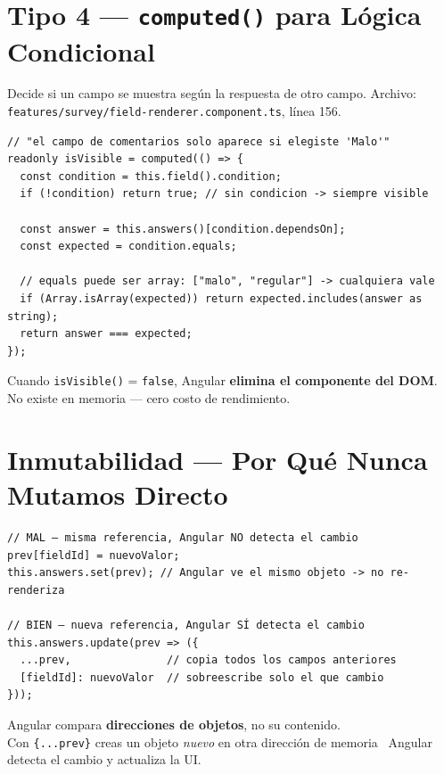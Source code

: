 \documentclass[12pt, a4paper]{article}
\begin{document}
\section{  Tipo 4 — \texttt{computed()} para Lógica Condicional}

Decide si un campo se muestra según la respuesta de otro campo.
Archivo: \textcolor{morado}{\texttt{features/survey/field-renderer.component.ts}}, línea 156.

\begin{lstlisting}
// "el campo de comentarios solo aparece si elegiste 'Malo'"
readonly isVisible = computed(() => {
  const condition = this.field().condition;
  if (!condition) return true; // sin condicion -> siempre visible

  const answer = this.answers()[condition.dependsOn];
  const expected = condition.equals;

  // equals puede ser array: ["malo", "regular"] -> cualquiera vale
  if (Array.isArray(expected)) return expected.includes(answer as string);
  return answer === expected;
});
\end{lstlisting}

\begin{tcolorbox}[importante, title={\emoji{red-exclamation-mark} \emoji{warning} No es \texttt{display:none}}]
  Cuando \texttt{isVisible()} = \texttt{false}, Angular \textbf{elimina el componente del DOM}.\\
  No existe en memoria — cero costo de rendimiento.
\end{tcolorbox}

\section{  Inmutabilidad — Por Qué Nunca Mutamos Directo}

\begin{lstlisting}
// MAL — misma referencia, Angular NO detecta el cambio
prev[fieldId] = nuevoValor;
this.answers.set(prev); // Angular ve el mismo objeto -> no re-renderiza

// BIEN — nueva referencia, Angular SÍ detecta el cambio
this.answers.update(prev => ({
  ...prev,               // copia todos los campos anteriores
  [fieldId]: nuevoValor  // sobreescribe solo el que cambio
}));
\end{lstlisting}

\begin{tcolorbox}[analogia, title={\emoji{house} \emoji{thinking-face} Por Qué Importa la Referencia}]
  Angular compara \textbf{direcciones de objetos}, no su contenido.\\
  Con \texttt{\{...prev\}} creas un objeto \textit{nuevo} en otra dirección de memoria \textrightarrow\ Angular detecta el cambio y actualiza la UI.
\end{tcolorbox}
\end{document}

